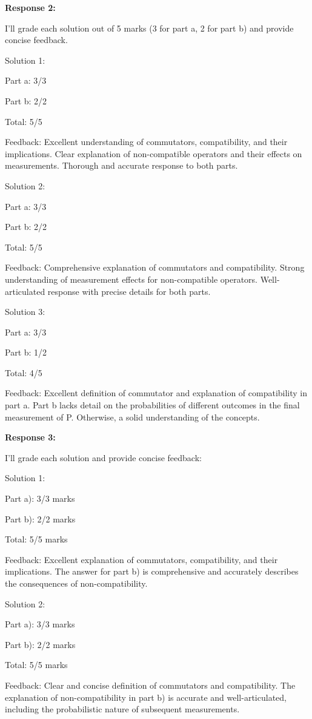 \documentclass[a4paper,11pt]{article}
\begin{document}
\bigskip
\textbf{Response 2:}

I'll grade each solution out of 5 marks (3 for part a, 2 for part b) and provide concise feedback.

Solution 1:

Part a: 3/3

Part b: 2/2

Total: 5/5

Feedback: Excellent understanding of commutators, compatibility, and their implications. Clear explanation of non-compatible operators and their effects on measurements. Thorough and accurate response to both parts.

Solution 2:

Part a: 3/3

Part b: 2/2

Total: 5/5

Feedback: Comprehensive explanation of commutators and compatibility. Strong understanding of measurement effects for non-compatible operators. Well-articulated response with precise details for both parts.

Solution 3:

Part a: 3/3

Part b: 1/2

Total: 4/5

Feedback: Excellent definition of commutator and explanation of compatibility in part a. Part b lacks detail on the probabilities of different outcomes in the final measurement of P. Otherwise, a solid understanding of the concepts.

\bigskip
\textbf{Response 3:}

I'll grade each solution and provide concise feedback:

Solution 1:

Part a): 3/3 marks

Part b): 2/2 marks

Total: 5/5 marks

Feedback: Excellent explanation of commutators, compatibility, and their implications. The answer for part b) is comprehensive and accurately describes the consequences of non-compatibility.

Solution 2:

Part a): 3/3 marks

Part b): 2/2 marks

Total: 5/5 marks

Feedback: Clear and concise definition of commutators and compatibility. The explanation of non-compatibility in part b) is accurate and well-articulated, including the probabilistic nature of subsequent measurements.
\end{document}
